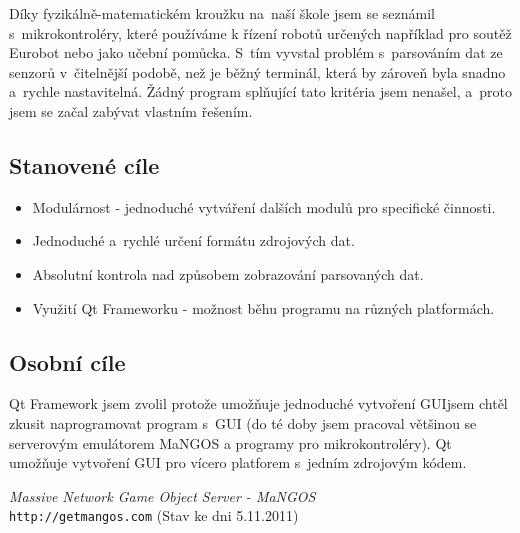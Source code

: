 \documentclass[12pt, a4paper, oneside]{article}
\newcommand{\It}{\textit}  %
\begin{document}
Díky fyzikálně-matematickém kroužku na~naší škole jsem se seznámil s~mikrokontroléry, které používáme k řízení robotů určených například pro soutěž Eurobot nebo jako učební pomůcka. S~tím vyvstal problém s~parsováním dat ze senzorů v~čitelnější podobě, než je běžný terminál, která by zároveň byla snadno a~rychle nastavitelná. Žádný program splňující tato kritéria jsem nenašel, a~proto jsem se začal zabývat vlastním řešením.
 
\subsection*{Stanovené cíle}

    \begin{itemize}
        \item Modulárnost - jednoduché vytváření dalších modulů pro specifické činnosti.

        \item Jednoduché a~rychlé určení formátu zdrojových dat.

        \item Absolutní kontrola nad způsobem zobrazování parsovaných dat.

        \item Využití Qt Frameworku - možnost běhu programu na různých platformách.

    \end{itemize}

\subsection*{Osobní cíle}
    Qt Framework jsem zvolil protože umožňuje jednoduché vytvoření GUIjsem chtěl zkusit naprogramovat program s~GUI (do té doby jsem pracoval většinou se serverovým emulátorem MaNGOS \cite{mangos} a programy pro mikrokontroléry). Qt umožňuje vytvoření GUI pro vícero platforem s~jedním zdrojovým kódem.



\newpage
{}


 \begin{thebibliography}{99}

   \It{Massive Network Game Object Server - MaNGOS} \\
   \verb#http://getmangos.com# (Stav ke dni 5.11.2011)

\end{thebibliography}
\end{document}
